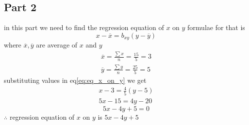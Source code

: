 \documentclass[12pt,twocolumn]{article}
\begin{document}
\subsection*{Part 2}
in this part we need to find the regression equation of $x$ on $y$
\newline
formulae for that is 
\begin{equation}
\label{eq:eq_x_on_y}
x-\overline{x} = b_{xy}(y-\overline{y})
\end{equation}
where $\overline{x},\overline{y}$ are average of $x$ and $y$
\begin{align}
\overline{x} = \frac{\sum x}{n} = \frac{15}{5} = 3 \\
\overline{y} = \frac{\sum y}{n} = \frac{25}{5} = 5
\end{align}
substituting values in eq\eqref{eq:eq_x_on_y} we get 
\begin{align}
x-3 = \frac{4}{5}(y-5) \\
5x - 15 = 4y - 20 
\end{align}
\begin{equation}
\label{formulae 3}
5x - 4y + 5 = 0
\end{equation}
$\therefore$ regression equation of $x$ on $y$ is $5x-4y+5$
\end{document}

